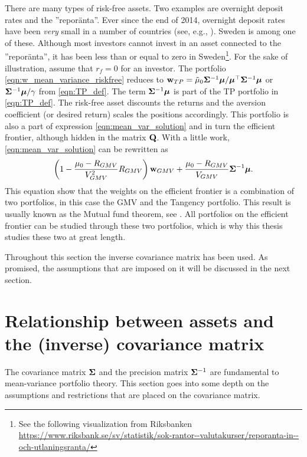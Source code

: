 \documentclass[12pt, twoside]{book}\usepackage{knitr}
\begin{document}
There are many types of risk-free assets.
Two examples are overnight deposit rates and the ''reporänta''.
Ever since the end of 2014, overnight deposit rates have been \textit{very} small in a number of countries (see, e.g., \cite{lopez2020have}).
Sweden is among one of these. 
Although most investors cannot invest in an asset connected to the ''reporänta'', it has been less than or equal to zero in Sweden\footnote{See the following visualization from Riksbanken \url{https://www.riksbank.se/sv/statistik/sok-rantor--valutakurser/reporanta-in--och-utlaningsranta/}}.
For the sake of illustration, assume that $r_f=0$ for an investor.
The portfolio \eqref{eqn:w_mean_variance_riskfree} reduces to $\mathbf{w}_{TP} = \tilde\mu_0 \mathbf{\Sigma}^{-1} \mbox{\boldmath$\mu$} / \mbox{\boldmath$\mu$}^\top \mathbf{\Sigma}^{-1} \mbox{\boldmath$\mu$}$ or $\mathbf{\Sigma}^{-1}\mbox{\boldmath$\mu$} / \gamma$ from \eqref{eqn:TP_def}. 
The term $\mathbf{\Sigma}^{-1} \mbox{\boldmath$\mu$}$ is part of the TP portfolio in \eqref{eqn:TP_def}. 
The risk-free asset discounts the returns and the aversion coefficient (or desired return) scales the positions accordingly.
This portfolio is also a part of expression \eqref{eqn:mean_var_solution} and in turn the efficient frontier, although hidden in the matrix $\mathbf{Q}$. 
With a little work, \eqref{eqn:mean_var_solution} can be rewritten as
$$
\left(1 - \frac{\mu_0-R_{GMV}}{V_{GMV}^2} R_{GMV} \right) \mathbf{w}_{GMV} + \frac{\mu_0-R_{GMV}}{V_{GMV}} \mathbf{\Sigma}^{-1} \mbox{\boldmath$\mu$}.
$$
This equation show that the weights on the efficient frontier is a combination of two portfolios, in this case the GMV and the Tangency portfolio. 
This result is usually known as the Mutual fund theorem, see \citet{tobin1958liquidity}.
All portfolios on the efficient frontier can be studied through these two portfolios, which is why this thesis studies these two at great length.

Throughout this section the inverse covariance matrix has been used.
As promised, the assumptions that are imposed on it will be discussed in the next section.

\section{Relationship between assets and the (inverse) covariance matrix}\label{sec:cov_prec_matrix}
The covariance matrix $\mathbf{\Sigma}$ and the precision matrix $\mathbf{\Sigma}^{-1}$ are fundamental to mean-variance portfolio theory. 
This section goes into some depth on the assumptions and restrictions that are placed on the covariance matrix.
\end{document}
